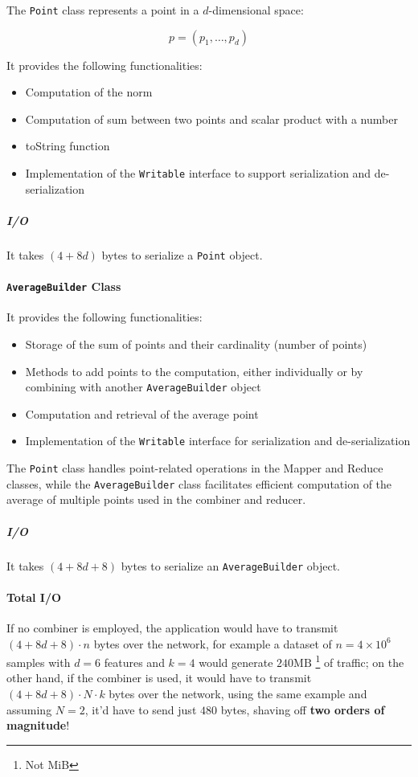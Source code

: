 \documentclass[parskip=full]{report}
\begin{document}
The \texttt{Point} class represents a point in a $d$-dimensional space:

\[
p = (p_1, \dots, p_d)
\]

It provides the following functionalities:

\begin{itemize}
	\item Computation of the norm
	
	\item Computation of sum between two points and scalar product with a number
	
	\item toString function
	
	\item Implementation of the \texttt{Writable} interface to support 
	serialization and de-serialization
	
\end{itemize}

\subparagraph{I/O}
It takes $(4 + 8d)$ bytes to serialize a \texttt{Point} object.

\paragraph{\texttt{AverageBuilder} Class}
It provides the following functionalities:

\begin{itemize}
	\item Storage of the sum of points and their cardinality (number of points)
	\item Methods to add points to the computation, either individually or by 
	combining with another \texttt{AverageBuilder} object
	\item Computation and retrieval of the average point
	\item Implementation of the \texttt{Writable} interface for serialization 
	and de-serialization
\end{itemize}

The \texttt{Point} class handles point-related operations in the Mapper and 
Reduce classes, while the \texttt{AverageBuilder} class facilitates efficient 
computation of the average of multiple points used in the combiner and reducer.

\subparagraph{I/O}
It takes $(4 + 8d + 8)$ bytes to serialize an \texttt{AverageBuilder} object.

\paragraph{Total I/O}
If no combiner is employed, the application would have to transmit $(4 + 8d + 
8) \cdot n$ bytes over the network, for example a dataset of $n = 4 \times 
10^6$ samples with $d = 6$ features and $k=4$ would generate $240 \text{MB}$ 
\footnote{Not MiB} of traffic; on the other hand, if the combiner is used, it 
would have to 
transmit $(4 + 8d + 8) \cdot N \cdot k$ bytes over the network, using the 
same example and assuming $N=2$, it'd have to send just $480$ bytes, 
shaving off \textbf{two orders of magnitude}!
\end{document}
